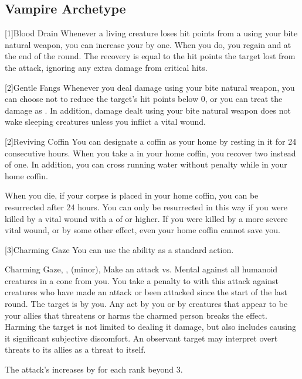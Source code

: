     \subsection{Vampire Archetype}

        [1]{Blood Drain} Whenever a living creature loses hit points from a  using your bite natural weapon, you can increase your  by one.
        When you do, you regain  and  at the end of the round.
        The recovery is equal to the hit points the target lost from the attack, ignoring any extra damage from critical hits.

        [2]{Gentle Fangs} Whenever you deal damage using your bite natural weapon, you can choose not to reduce the target's hit points below 0, or you can treat the damage as .
        In addition, damage dealt using your bite natural weapon does not wake sleeping creatures unless you inflict a vital wound.

        [2]{Reviving Coffin} You can designate a coffin as your home by resting in it for 24 consecutive hours.
        When you take a  in your home coffin, you recover two  instead of one.
        In addition, you can cross running water without penalty while in your home coffin.

        When you die, if your corpse is placed in your home coffin, you can be resurrected after 24 hours.
        You can only be resurrected in this way if you were killed by a vital wound with a  of  or higher.
        If you were killed by a more severe vital wound, or by some other effect, even your home coffin cannot save you.

        [3]{Charming Gaze} You can use the  ability as a standard action.
        \begin{magicalsustainability}{Charming Gaze}{, ,  (minor), }
            \rankline
            Make an attack vs. Mental against all humanoid creatures in a \largearea cone from you.
            You take a  penalty to  with this attack against creatures who have made an attack or been attacked since the start of the last round.
            \hit The target is \charmed by you.
            Any act by you or by creatures that appear to be your allies that threatens or harms the charmed person breaks the effect.
            Harming the target is not limited to dealing it damage, but also includes causing it significant subjective discomfort.
            An observant target may interpret overt threats to its allies as a threat to itself.

            \rankline

            \noindent The attack's  increases by  for each rank beyond 3.
        \end{magicalsustainability}

